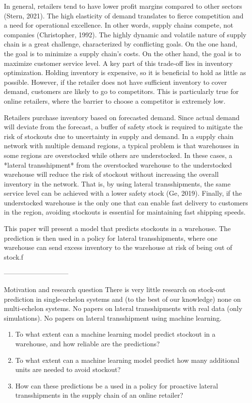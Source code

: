 \documentclass[../../main.tex]{subfiles}
\begin{document}
In general, retailers tend to have lower profit margins compared to other sectors (Stern, 2021). The high elasticity of demand translates to fierce competition and a need for operational excellence. In other words, supply chains compete, not companies (Christopher, 1992). The highly dynamic and volatile nature of supply chain is a great challenge, characterized by conflicting goals. On the one hand, the goal is to minimize a supply chain's costs. On the other hand, the goal is to maximize customer service level. A key part of this trade-off lies in inventory optimization. Holding inventory is expensive, so it is beneficial to hold as little as possible. However, if the retailer does not have sufficient inventory to cover demand, customers are likely to go to competitors. This is particularly true for online retailers, where the barrier to choose a competitor is extremely low. 

Retailers purchase inventory based on forecasted demand. Since actual demand will deviate from the forecast, a buffer of safety stock is required to mitigate the risk of stockouts due to uncertainty in supply and demand. In a supply chain network with multiple demand regions, a typical problem is that warehouses in some regions are overstocked while others are understocked. In these cases, a *lateral transshipment* from the overstocked warehouse to the understocked warehouse will reduce the risk of stockout without increasing the overall inventory in the network. That is, by using lateral transshipments, the same service level can be achieved with a lower safety stock  (Ge, 2019). Finally, if the understocked warehouse is the only one that can enable fast delivery to customers in the region, avoiding stockouts is essential for maintaining fast shipping speeds.

This paper will present a model that predicts stockouts in a warehouse. The prediction is then used in a policy for lateral transshipments, where one warehouse can send excess inventory to the warehouse at risk of being out of stock.f

-----------------------------

Motivation and research question
There is very little research on stock-out prediction in single-echelon systems and (to the best of our knowledge) none on multi-echelon systems. No papers on lateral transshipments with real data (only simulations). No papers on lateral transshipment using machine learning.

\begin{enumerate}
\item To what extent can a machine learning model predict stockout in a warehouse, and how reliable are the predictions?
\item To what extent can a machine learning model predict how many additional units are needed to avoid stockout?
\item How can these predictions be a used in a policy for proactive lateral transshipments in the supply chain of an online retailer?
\end{enumerate}
\end{document}
